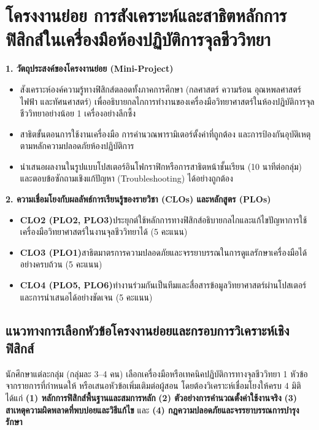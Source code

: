 \chapter{โครงงานย่อย การสังเคราะห์และสาธิตหลักการฟิสิกส์ในเครื่องมือห้องปฏิบัติการจุลชีววิทยา}

\begin{planbox}
\textbf{1. วัตถุประสงค์ของโครงงานย่อย (Mini-Project)}
\begin{itemize}
    \item สังเคราะห์องค์ความรู้ทางฟิสิกส์ตลอดทั้งภาคการศึกษา (กลศาสตร์ ความร้อน อุณหพลศาสตร์ ไฟฟ้า และทัศนศาสตร์) เพื่ออธิบายกลไกการทำงานของเครื่องมือวิทยาศาสตร์ในห้องปฏิบัติการจุลชีววิทยาอย่างน้อย 1 เครื่องอย่างลึกซึ้ง
    \item สาธิตขั้นตอนการใช้งานเครื่องมือ การคำนวณพารามิเตอร์ตั้งค่าที่ถูกต้อง และการป้องกันอุบัติเหตุตามหลักความปลอดภัยห้องปฏิบัติการ
    \item นำเสนอผลงานในรูปแบบโปสเตอร์อินโฟกราฟิกหรือการสาธิตหน้าชั้นเรียน (10 นาทีต่อกลุ่ม) และตอบข้อซักถามเชิงแก้ปัญหา (Troubleshooting) ได้อย่างถูกต้อง
\end{itemize}
\textbf{2. ความเชื่อมโยงกับผลลัพธ์การเรียนรู้ของรายวิชา (CLOs) และหลักสูตร (PLOs)}
\begin{itemize}
    \item \textbf{CLO2 (PLO2, PLO3)}\quad ประยุกต์ใช้หลักการทางฟิสิกส์อธิบายกลไกและแก้ไขปัญหาการใช้เครื่องมือวิทยาศาสตร์ในงานจุลชีววิทยาได้ (5 คะแนน)
    \item \textbf{CLO3 (PLO1)}\quad สาธิตมาตรการความปลอดภัยและจรรยาบรรณในการดูแลรักษาเครื่องมือได้อย่างครบถ้วน (5 คะแนน)
    \item \textbf{CLO4 (PLO5, PLO6)}\quad ทำงานร่วมกันเป็นทีมและสื่อสารข้อมูลวิทยาศาสตร์ผ่านโปสเตอร์และการนำเสนอได้อย่างชัดเจน (5 คะแนน)
\end{itemize}
\end{planbox}

\section{แนวทางการเลือกหัวข้อโครงงานย่อยและกรอบการวิเคราะห์เชิงฟิสิกส์}

นักศึกษาแต่ละกลุ่ม (กลุ่มละ 3--4 คน) เลือกเครื่องมือหรือเทคนิคปฏิบัติการทางจุลชีววิทยา 1 หัวข้อจากรายการที่กำหนดให้ หรือเสนอหัวข้อเพิ่มเติมต่อผู้สอน โดยต้องวิเคราะห์เชื่อมโยงให้ครบ 4 มิติ ได้แก่ \textbf{(1) หลักการฟิสิกส์พื้นฐานและสมการหลัก} \textbf{(2) ตัวอย่างการคำนวณตั้งค่าใช้งานจริง} \textbf{(3) สาเหตุความผิดพลาดที่พบบ่อยและวิธีแก้ไข} และ \textbf{(4) กฎความปลอดภัยและจรรยาบรรณการบำรุงรักษา}

